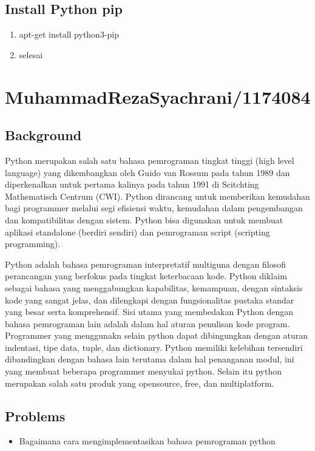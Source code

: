 \subsection{Install Python pip}
\begin{enumerate}
\item apt-get install python3-pip
\item selesai
\end{enumerate}


\section{MuhammadRezaSyachrani/1174084}
\subsection{Background}
	Python merupakan salah satu bahasa pemrograman tingkat tinggi (high level language) yang dikembangkan oleh Guido van Rossum pada tahun 1989 dan diperkenalkan untuk pertama kalinya pada tahun 1991 di Scitchting Mathematisch Centrum (CWI).
	Python dirancang untuk memberikan kemudahan bagi programmer melalui segi efisiensi waktu, kemudahan dalam pengembangan dan kompatibilitas dengan sistem. Python bisa digunakan untuk membuat aplikasi standalone (berdiri sendiri) dan
	pemrograman script (scripting programming).
	\par
	Python adalah bahasa pemrograman interpretatif multiguna dengan filosofi perancangan yang berfokus pada tingkat keterbacaan kode. Python diklaim sebagai bahasa yang menggabungkan kapabilitas, kemampuan, dengan sintaksis kode yang sangat jelas,
	dan dilengkapi dengan fungsionalitas pustaka standar yang besar serta komprehensif. 
	Sisi utama yang membedakan Python dengan bahasa pemrograman lain adalah dalam hal aturan penulisan kode
	program. Programmer yang menggunakn selain python dapat dibingungkan dengan aturan indentasi, tipe data,
	tuple, dan dictionary. Python memiliki kelebihan tersendiri dibandingkan dengan bahasa lain terutama
	dalam hal penanganan modul, ini yang membuat beberapa programmer menyukai python. Selain itu
	python merupakan salah satu produk yang opensource, free, dan multiplatform.
	
\subsection{Problems}
\begin{itemize}
	\item Bagaimana cara mengimplementasikan bahasa pemrograman python
\end{itemize}
	
